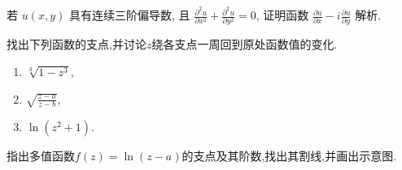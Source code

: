 \documentclass[10pt]{article}
\newenvironment{problem}[2][]{\begin{trivlist}
\item[\hskip \labelsep {\bfseries #1}\hskip \labelsep {\bfseries #2}]}{\end{trivlist}}
\begin{document}
\begin{problem}{1.6}
若 $u(x, y)$ 具有连续三阶偏导数, 且 $\frac{\partial^2 u}{\partial x^2}+\frac{\partial^2 u}{\partial y^2}=0$,
 证明函数 $\frac{\partial u}{\partial x}-i \frac{\partial u}{\partial y}$ 解析.
\end{problem}

\begin{problem}{1.7}
  找出下列函数的支点,并讨论$z$绕各支点一周回到原处函数值的变化.
  \begin{enumerate}
    \item $\sqrt[3]{1-z^3}$,
    \item $\sqrt{\frac{z-a}{z-b}}$,
    \item $\ln{(z^2 + 1)}$.
  \end{enumerate}

\end{problem}

\begin{problem}{1.8}
  指出多值函数$f(z) = \ln{(z-a)}$的支点及其阶数,找出其割线,并画出示意图.
\end{problem}


\end{document}
